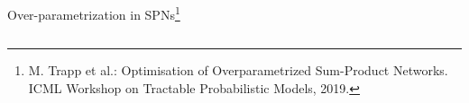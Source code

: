 \begin{frame}{Over-parametrization in SPNs\footnote{\scriptsize M. Trapp et al.: Optimisation of Overparametrized Sum-Product Networks. ICML Workshop on Tractable Probabilistic Models, 2019.}}{}
\begin{columns}
\begin{column}{\linewidth}
\end{column}
\end{columns}
\end{frame}

